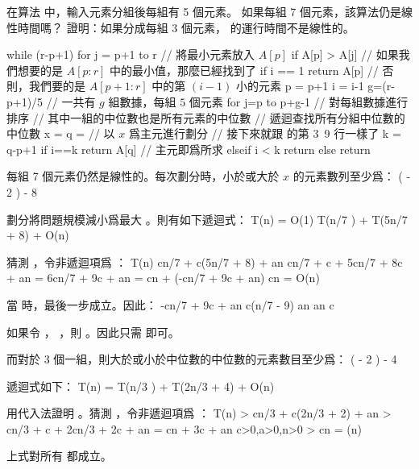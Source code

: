 
\startEXERCISE[exercise:9_3_1]
在算法  中，輸入元素分組後每組有 5 個元素。
如果每組 7 個元素，該算法仍是線性時間嗎？
證明：如果分成每組 3 個元素，  的運行時間不是線性的。

\startCLRSCODE
while (r-p+1)  
	for j = p+1 to r	// 將最小元素放入 $A[p]$
		if A[p] > A[j]
	// 如果我們想要的是 $A[p:r]$ 中的最小值，那麼已經找到了
	if i == 1
		return A[p]
	// 否則，我們要的是 $A[p+1:r]$ 中的第 $(i-1)$ 小的元素
	p = p+1
	i = i-1
g=(r-p+1)/5	// 一共有 $g$ 組數據，每組 $5$ 個元素
for j=p to p+g-1	// 對每組數據進行排序
// 其中一組的中位數也是所有元素的中位數
// 遞迴查找所有分組中位數的中位數
x = 
q = 	// 以 $x$ 爲主元進行劃分
// 接下來就跟  的第 3~9 行一樣了
k = q-p+1
if i==k
	return A[q]	// 主元即爲所求
elseif i < k
	return 
else
	return 
\stopCLRSCODE
\stopEXERCISE

\startANSWER
每組 7 個元素仍然是線性的。每次劃分時，小於或大於 $x$ 的元素數列至少爲：
 \left(\left\lceil {} \left\lceil {} \right\rceil \right\rceil
           - 2 \right) \ge {} - 8
\stopformula

劃分將問題規模減小爲最大 。則有如下遞迴式：
\startformula
T(n) = \startmathcases
 \NC O(1) \NC {} \NR
 \NC T(\lceil n/7 \rceil) + T(5n/7 + 8) + O(n) \NC {} \NR
\stopmathcases
\stopformula

猜測 ，令非遞迴項爲 ：
\startsplitformula\startmathalignment
\NC T(n) \NC \le c\lceil n/7 \rceil + c(5n/7 + 8) + an \NR
\NC \NC \le cn/7 + c + 5cn/7 + 8c + an \NR
\NC \NC = 6cn/7 + 9c + an \NR
\NC \NC = cn + (-cn/7 + 9c + an) \NR
\NC \NC \le cn \NR
\NC \NC = O(n) \NR
\stopmathalignment\stopsplitformula

當  時，最後一步成立。因此：
\startsplitformula\startmathalignment[n=1]
\NC -cn/7 + 9c + an  \NR
\NC \Downarrow \NR
\NC c(n/7 - 9) \ge an \NR
\NC \Downarrow \NR
\NC {} \ge an \NR
\NC \Downarrow \NR
\NC c \ge {} \NR
\stopmathalignment\stopsplitformula

如果令 ， ，則 。因此只需  即可。

而對於 3 個一組，則大於或小於中位數的中位數的元素數目至少爲：
 \left(\left\lceil {} \left\lceil {} \right\rceil \right\rceil
           - 2 \right) \ge {} - 4
\stopformula

遞迴式如下：
\startformula
T(n) = T(\lceil n/3 \rceil) + T(2n/3 + 4) + O(n)
\stopformula

用代入法證明 。猜測 ，令非遞迴項爲 ：
\startsplitformula\startmathalignment
\NC T(n) \NC > c\lceil n/3 \rceil + c(2n/3 + 2) + an \NR
\NC \NC > cn/3 + c + 2cn/3 + 2c + an \NR
\NC \NC = cn + 3c + an \qquad c>0,a>0,n>0\NR
\NC \NC > cn \NR
\NC \NC = \omega(n) \NR
\stopmathalignment\stopsplitformula

上式對所有  都成立。
\stopANSWER
